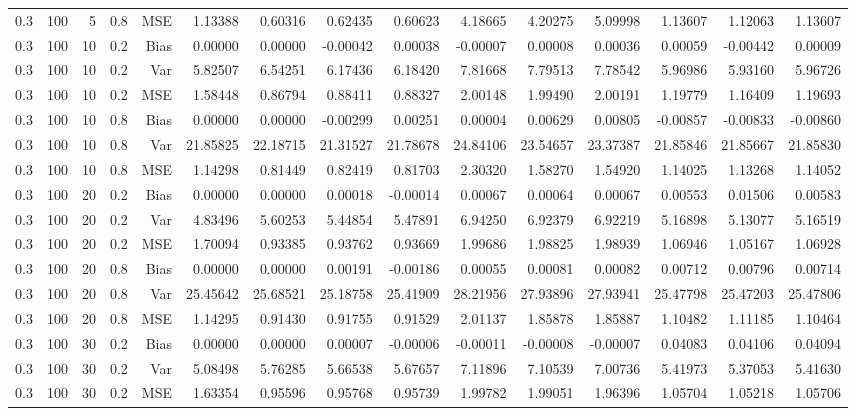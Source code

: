 \begin{table}[!htbp]
\begin{tabular}{lrrrrrrrrrrrrrr}
0.3 & 100 &  5 & 0.8 & MSE & 1.13388 & 0.60316 & 0.62435 & 0.60623 & 4.18665 & 4.20275 & 5.09998 & 1.13607 & 1.12063 & 1.13607 \\
0.3 & 100 & 10 & 0.2 & Bias & 0.00000 & 0.00000 & -0.00042 & 0.00038 & -0.00007 & 0.00008 & 0.00036 & 0.00059 & -0.00442 & 0.00009 \\
0.3 & 100 & 10 & 0.2 & Var & 5.82507 & 6.54251 & 6.17436 & 6.18420 & 7.81668 & 7.79513 & 7.78542 & 5.96986 & 5.93160 & 5.96726 \\
0.3 & 100 & 10 & 0.2 & MSE & 1.58448 & 0.86794 & 0.88411 & 0.88327 & 2.00148 & 1.99490 & 2.00191 & 1.19779 & 1.16409 & 1.19693 \\
0.3 & 100 & 10 & 0.8 & Bias & 0.00000 & 0.00000 & -0.00299 & 0.00251 & 0.00004 & 0.00629 & 0.00805 & -0.00857 & -0.00833 & -0.00860 \\
0.3 & 100 & 10 & 0.8 & Var & 21.85825 & 22.18715 & 21.31527 & 21.78678 & 24.84106 & 23.54657 & 23.37387 & 21.85846 & 21.85667 & 21.85830 \\
0.3 & 100 & 10 & 0.8 & MSE & 1.14298 & 0.81449 & 0.82419 & 0.81703 & 2.30320 & 1.58270 & 1.54920 & 1.14025 & 1.13268 & 1.14052 \\
0.3 & 100 & 20 & 0.2 & Bias & 0.00000 & 0.00000 & 0.00018 & -0.00014 & 0.00067 & 0.00064 & 0.00067 & 0.00553 & 0.01506 & 0.00583 \\
0.3 & 100 & 20 & 0.2 & Var & 4.83496 & 5.60253 & 5.44854 & 5.47891 & 6.94250 & 6.92379 & 6.92219 & 5.16898 & 5.13077 & 5.16519 \\
0.3 & 100 & 20 & 0.2 & MSE & 1.70094 & 0.93385 & 0.93762 & 0.93669 & 1.99686 & 1.98825 & 1.98939 & 1.06946 & 1.05167 & 1.06928 \\
0.3 & 100 & 20 & 0.8 & Bias & 0.00000 & 0.00000 & 0.00191 & -0.00186 & 0.00055 & 0.00081 & 0.00082 & 0.00712 & 0.00796 & 0.00714 \\
0.3 & 100 & 20 & 0.8 & Var & 25.45642 & 25.68521 & 25.18758 & 25.41909 & 28.21956 & 27.93896 & 27.93941 & 25.47798 & 25.47203 & 25.47806 \\
0.3 & 100 & 20 & 0.8 & MSE & 1.14295 & 0.91430 & 0.91755 & 0.91529 & 2.01137 & 1.85878 & 1.85887 & 1.10482 & 1.11185 & 1.10464 \\
0.3 & 100 & 30 & 0.2 & Bias & 0.00000 & 0.00000 & 0.00007 & -0.00006 & -0.00011 & -0.00008 & -0.00007 & 0.04083 & 0.04106 & 0.04094 \\
0.3 & 100 & 30 & 0.2 & Var & 5.08498 & 5.76285 & 5.66538 & 5.67657 & 7.11896 & 7.10539 & 7.00736 & 5.41973 & 5.37053 & 5.41630 \\
0.3 & 100 & 30 & 0.2 & MSE & 1.63354 & 0.95596 & 0.95768 & 0.95739 & 1.99782 & 1.99051 & 1.96396 & 1.05704 & 1.05218 & 1.05706 \\

\end{tabular}
\end{table}
